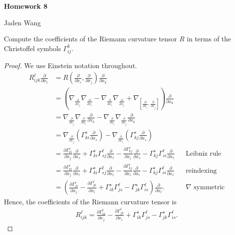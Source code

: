 \documentclass[12pt]{article}
\begin{document}
\centerline {\textsf{\textbf{\LARGE{Homework 8}}}}
\centerline {Jaden Wang}
\vspace{.15in}
\begin{problem}[1]
Compute the coefficients of the Riemann curvature tensor $ R$ in terms of the Christoffel symbols  $ \Gamma_{ij}^{k}$.
\end{problem}
\begin{proof}
	We use Einstein notation throughout.
\begin{align*}
	R_{ijk}^{ \ell} \frac{\partial }{\partial x_\ell} &=  R\left( \frac{\partial }{\partial x_i} , \frac{\partial }{\partial x_j}  \right) \frac{\partial }{\partial x_k}   \\
							  &= \left( \nabla _{\frac{\partial }{\partial x_j} } \nabla_{ \frac{\partial }{\partial x_i}}- \nabla_{ \frac{\partial }{\partial x_i}} \nabla_{ \frac{\partial }{\partial x_j} } + \nabla _{ \left[ \frac{\partial }{\partial x_i} ,\frac{\partial }{\partial x_j}  \right]}  \right) \frac{\partial }{\partial x_k} \\
							  &= \nabla _{ \frac{\partial }{\partial x_j} } \nabla_{ \frac{\partial }{\partial x_i}} \frac{\partial }{\partial x_k} - \nabla_{ \frac{\partial }{\partial x_i}} \nabla_{ \frac{\partial }{\partial x_j} }\frac{\partial }{\partial x_k}   \\
							  &= \nabla _{ \frac{\partial }{\partial x_j} } \left( \Gamma_{ k i}^{ s} \frac{\partial }{\partial x_s}  \right) - \nabla _{ \frac{\partial }{\partial x_i} } \left( \Gamma_{ k j}^{ s} \frac{\partial }{\partial x_s}  \right)   \\
							  &= \frac{\partial \Gamma_{ k i}^{ s} }{\partial x_j} \frac{\partial }{\partial x_s} + \Gamma_{ k i}^{ s} \Gamma_{ sj}^{ \ell} \frac{\partial }{\partial x_\ell} -  \frac{\partial \Gamma_{ k j}^{ s} }{\partial x_i} \frac{\partial }{\partial x_s} - \Gamma_{ k j}^{ s} \Gamma_{ si}^{ \ell} \frac{\partial }{\partial x_\ell}  && \text{Leibniz rule}  \\
							  &=  \frac{\partial \Gamma_{ k i}^{ \ell} }{\partial x_j} \frac{\partial }{\partial x_\ell} + \Gamma_{ k i}^{ s} \Gamma_{ sj}^{ \ell} \frac{\partial }{\partial x_\ell} -  \frac{\partial \Gamma_{ k j}^{ \ell} }{\partial x_i} \frac{\partial }{\partial x_\ell} - \Gamma_{ k j}^{ s} \Gamma_{ si}^{ \ell} \frac{\partial }{\partial x_\ell} && \text{reindexing}  \\
							  &= \left(  \frac{\partial \Gamma_{ ik}^{ \ell} }{\partial x_j} -  \frac{\partial \Gamma_{ jk}^{ \ell} }{\partial x_i} + \Gamma_{ ik}^{ s} \Gamma_{ js}^{ \ell} - \Gamma_{ jk}^{ s} \Gamma_{ is}^{ \ell} \right)  \frac{\partial }{\partial x_\ell}. && \nabla \text{ symmetric} 
\end{align*}
Hence, the coefficients of the Riemann curvature tensor is
\begin{align*}
	R_{ijk}^{ \ell} =   \frac{\partial \Gamma_{ ik}^{ \ell} }{\partial x_j} -  \frac{\partial \Gamma_{ jk}^{ \ell} }{\partial x_i}  + \Gamma_{ ik}^{ s} \Gamma_{ js}^{ \ell} - \Gamma_{ jk}^{ s} \Gamma_{ is}^{ \ell}. 
\end{align*}
\end{proof}
\end{document}
